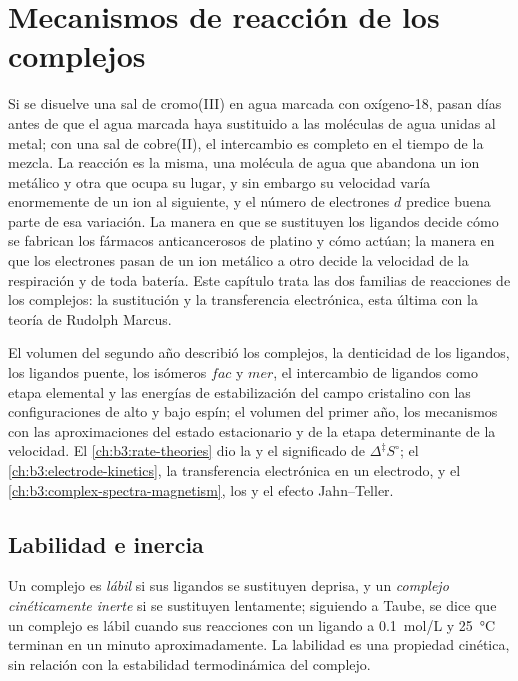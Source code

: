 \chapter{Mecanismos de reacción de los complejos}\label{ch:b3:complex-mechanisms}

Si se disuelve una sal de cromo(III) en agua marcada con oxígeno-18, pasan días
antes de que el agua marcada haya sustituido a las moléculas de agua unidas al
metal; con una sal de cobre(II), el intercambio es completo en el tiempo de la
mezcla. La reacción es la misma, una molécula de agua que abandona un ion metálico y
otra que ocupa su lugar, y sin embargo su velocidad varía enormemente de un ion al
siguiente, y el número de electrones $d$ predice buena parte de esa variación. La manera
en que se sustituyen los ligandos decide cómo se fabrican los fármacos anticancerosos de platino y cómo
actúan; la manera en que los electrones pasan de un ion metálico a otro decide la velocidad de
la respiración y de toda batería. Este capítulo trata las dos familias de
reacciones de los complejos: la sustitución y la transferencia electrónica, esta última con
la teoría de Rudolph Marcus.

\begin{recall}
El volumen del segundo año describió los complejos, la denticidad de los ligandos, los ligandos
puente, los isómeros $fac$ y $mer$, el intercambio de ligandos como etapa elemental y
las energías de estabilización del campo cristalino con las configuraciones de alto y bajo espín;
el volumen del primer año, los mecanismos con las aproximaciones del estado estacionario y de la etapa
determinante de la velocidad. El \cref{ch:b3:rate-theories} dio la  y el
significado de $\Delta^{\ddagger}S^\circ$; el \cref{ch:b3:electrode-kinetics}, la transferencia electrónica en un
electrodo, y el \cref{ch:b3:complex-spectra-magnetism}, los  y el
efecto Jahn--Teller.
\end{recall}

\section{Labilidad e inercia}

\begin{definition}\label{def:b3:complex-mechanisms:labile}
Un complejo es \emph{lábil} si sus ligandos se sustituyen
deprisa, y un \emph{complejo cinéticamente inerte}
si se sustituyen lentamente; siguiendo a Taube, se dice que un complejo es lábil cuando
sus reacciones con un ligando a \qty{0.1}{mol/L} y \qty{25}{\celsius} terminan en un
minuto aproximadamente. La labilidad es una propiedad cinética, sin relación con la estabilidad
termodinámica del complejo.
\end{definition}

